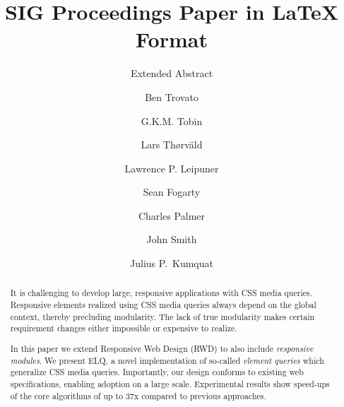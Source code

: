 \documentclass[sigconf,9pt]{acmart}
\newcommand{\elq}{ELQ}
\begin{document}
\title{SIG Proceedings Paper in LaTeX Format}
\subtitle{Extended Abstract}


\author{Ben Trovato}

\author{G.K.M. Tobin}

\author{Lars Th{\o}rv{\"a}ld}

\author{Lawrence P. Leipuner}

\author{Sean Fogarty}

\author{Charles Palmer}

\author{John Smith}

\author{Julius P.~Kumquat}

\renewcommand{\shortauthors}{B. Trovato et al.}


\begin{abstract}
    It is challenging to develop large, responsive applications with CSS
    media queries. Responsive elements realized using CSS media queries
    always depend on the global context, thereby precluding
    modularity. The lack of true modularity makes certain requirement
    changes either impossible or expensive to realize.

    In this paper we extend Responsive Web Design (RWD) to also include
    {\em responsive modules}.  We present \elq{}, a novel implementation
    of so-called \emph{element queries} which generalize CSS media
    queries.  Importantly, our design conforms to existing web
    specifications, enabling adoption on a large scale.  Experimental
    results show speed-ups of the core algorithms of up to 37x compared
    to previous approaches.
\end{abstract}
\end{document}

